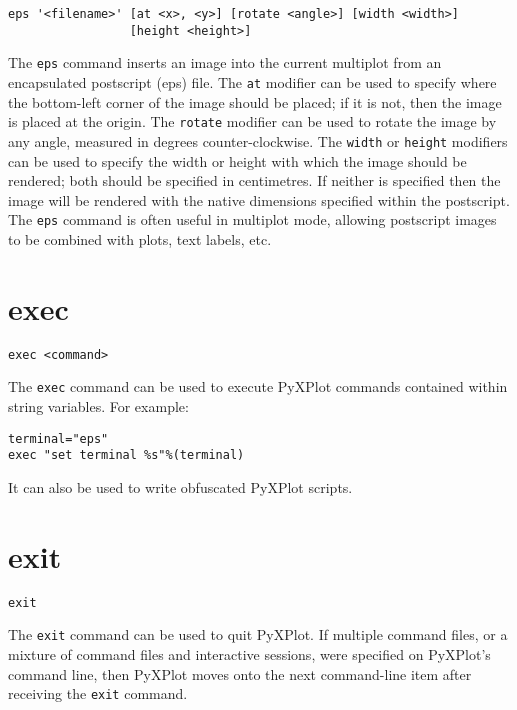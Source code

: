 \begin{verbatim}
eps '<filename>' [at <x>, <y>] [rotate <angle>] [width <width>]
                 [height <height>]
\end{verbatim}

The {\tt eps} command inserts an image into the current multiplot from an
encapsulated postscript (eps) file.  The {\tt at} modifier can be used to
specify where the bottom-left corner of the image should be placed; if it is
not, then the image is placed at the origin. The {\tt rotate} modifier can be
used to rotate the image by any angle, measured in degrees counter-clockwise.
The {\tt width} or {\tt height} modifiers can be used to specify the width or
height with which the image should be rendered; both should be specified in
centimetres. If neither is specified then the image will be rendered with the
native dimensions specified within the postscript.  The {\tt eps} command is
often useful in multiplot mode, allowing postscript images to be combined with
plots, text labels, etc.

\section{exec}

\begin{verbatim}
exec <command>
\end{verbatim}

The {\tt exec} command can be used to execute PyXPlot commands contained within
string variables. For example:

\begin{verbatim}
terminal="eps"
exec "set terminal %s"%(terminal)
\end{verbatim}

It can also be used to write obfuscated PyXPlot scripts.

\section{exit}

\begin{verbatim}
exit
\end{verbatim}

The {\tt exit} command can be used to quit PyXPlot. If multiple command files,
or a mixture of command files and interactive sessions, were specified on
PyXPlot's command line, then PyXPlot moves onto the next command-line item
after receiving the {\tt exit} command.

